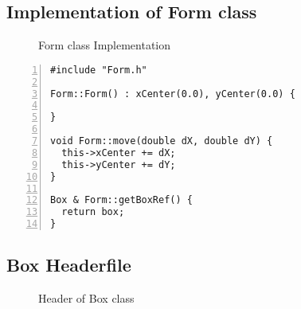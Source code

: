 \documentclass{article}
\begin{document}
\subsection{Implementation of Form class}
\begin{figure}
  \scriptsize{\caption{Form class Implementation}}
\end{figure}

\begin{lstlisting}[basicstyle=\footnotesize\ttfamily, numbers=left, stepnumber=1, numberstyle = \normalsize, caption={My Caption}]
#include "Form.h"

Form::Form() : xCenter(0.0), yCenter(0.0) {

}

void Form::move(double dX, double dY) {
  this->xCenter += dX;
  this->yCenter += dY;
}

Box & Form::getBoxRef() {
  return box;
}
\end{lstlisting}

\subsection{Box Headerfile}
\begin{figure}
  \scriptsize{\caption{Header of Box class}}
\end{figure}
\end{document}
